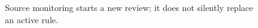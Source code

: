 \begin{figure}[H]
\centering
{}
\caption{Source monitoring starts a new review; it does not silently replace an active rule.}\label{fig:teach-M10-04}
\end{figure}
